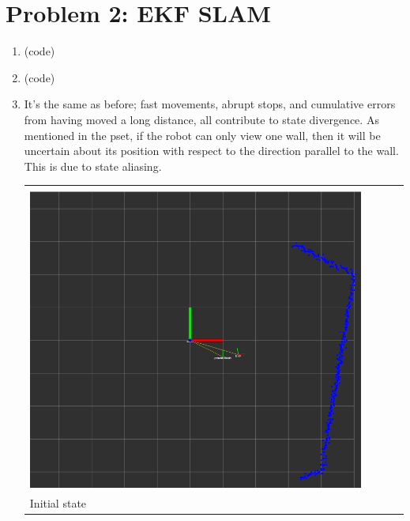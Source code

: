 \documentclass{article}
\begin{document}
\section*{Problem 2: EKF SLAM}
\begin{enumerate}[label=(\roman*)]
\item %
(code)

\item %
(code)

\item %
It's the same as before; fast movements, abrupt stops, and cumulative errors from having moved a long distance, all contribute to state divergence. As mentioned in the pset, if the robot can only view one wall, then it will be uncertain about its position with respect to the direction parallel to the wall. This is due to state aliasing.

\begin{tabular}[t]{l}
	\hline \\
	\includegraphics[width=0.9\textwidth]{img/p2-initial.png} \\
	\hline
	Initial state \\
\end{tabular}


\end{enumerate}
\end{document}
